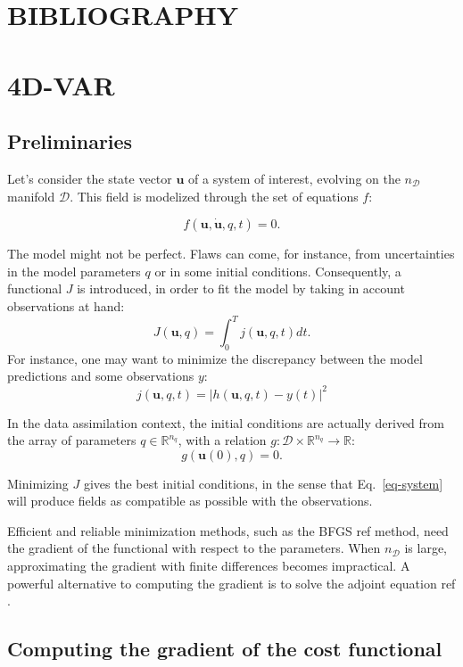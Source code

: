 \documentclass[10pt,openany,onecolumn,a4wide,pof]{article}
\newcommand{\todo}[1]{{\color{red} #1 }}
\newcommand{\gras}[1]{\boldsymbol{#1}}
\newcommand{\Ephaz}{\mathcal{D}}%
\newcommand{\Nphaz}{n_{\mathcal{D}}} %
\newcommand{\fdyn}{f} %
\newcommand{\costf}{J} %
\newcommand{\costff}{j} %
\newcommand{\obs}{y} %
\newcommand{\point}{\gras{u}} %
\begin{document}
\section*{BIBLIOGRAPHY}


\appendix

\section{4D-VAR}
\subsection{Preliminaries}
Let's consider the state vector $\point$ of a system of interest, evolving on the $\Nphaz$ manifold $\Ephaz $. This field is modelized through the set of equations $\fdyn$:

\begin{equation}
\fdyn(\point,\dot{\point},q,t) =0.
\label{eq-system}
\end{equation} 

The model might not be perfect. Flaws can come, for instance, from
uncertainties in the model parameters $q$ or in some initial conditions.
Consequently, a functional $\costf$ is introduced, in order to fit the model
by taking in account observations at hand:
\begin{equation}
\costf(\point,q) = \int_0^T  \costff(\point,q,t) dt.
\label{eq-def_cost}
\end{equation} 
For instance, one may want to minimize the discrepancy between the model predictions and some observations $\obs$:
$$\costff(\point,q,t) = \left|h(\point,q,t) - \obs(t)\right|^2$$ 

In the data assimilation context, the initial conditions are actually derived from the array of parameters $q\in\mathbb{R}^{n_q}$, with a relation $g:\Ephaz\times\mathbb{R}^{n_q}\rightarrow\mathbb{R}$:
$$g(\point(0),q) = 0.$$

Minimizing $\costf$ gives the best initial conditions, in the sense that Eq.~\eqref{eq-system} will produce fields as compatible as possible with the observations.

Efficient and reliable minimization methods, such as the BFGS\todo{ref}
method, need the gradient of the functional with respect to the parameters.
When $\Nphaz$ is large, approximating the gradient with finite differences
becomes impractical. A powerful alternative to computing the gradient is to
solve the adjoint equation\todo{ref}.
\subsection{Computing the gradient of the cost functional}
\end{document}
